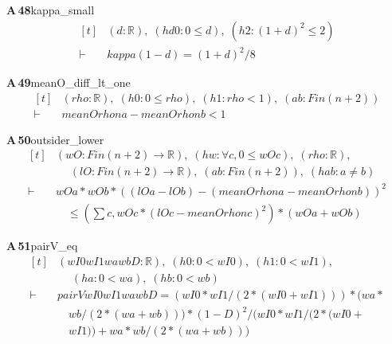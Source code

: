 \documentclass[conference]{IEEEtran}
\theoremstyle{definition}
\newcommand{\lean}[1]{\textsf{\footnotesize #1}}
\begin{document}
\noindent\textbf{A\,48}\quad\lean{kappa\_small}
{\footnotesize\[ \begin{aligned}[t]
&(\mathit{d} : \mathbb{R} ),\; (\mathit{hd0} : 0 \leq \mathit{d}),\; (\mathit{h2} : (1+\mathit{d})^{2} \leq 2)\\
\vdash\;&\mathit{kappa} (1-\mathit{d}) = (1+\mathit{d})^{2}/8
\end{aligned} \]}

\noindent\textbf{A\,49}\quad\lean{meanO\_diff\_lt\_one}
{\footnotesize\[ \begin{aligned}[t]
&(\mathit{rho} : \mathbb{R} ),\; (\mathit{h0} : 0 \leq \mathit{rho}),\; (\mathit{h1} : \mathit{rho} < 1),\; (\mathit{a} \mathit{b} : \mathit{Fin} (\mathit{n}+2))\\
\vdash\;&\mathit{meanO} \mathit{rho} \mathit{n} \mathit{a} - \mathit{meanO} \mathit{rho} \mathit{n} \mathit{b} < 1
\end{aligned} \]}

\noindent\textbf{A\,50}\quad\lean{outsider\_lower}
{\footnotesize\[ \begin{aligned}[t]
&(\mathit{wO} : \mathit{Fin} (\mathit{n}+2) \to \mathbb{R} ),\; (\mathit{hw} : \forall \mathit{c}, 0 \leq \mathit{wO} \mathit{c}),\; (\mathit{rho} : \mathbb{R} ),\\
&\quad \; (\mathit{lO} : \mathit{Fin} (\mathit{n}+2) \to \mathbb{R} ),\; (\mathit{a} \mathit{b} : \mathit{Fin} (\mathit{n}+2)),\; (\mathit{hab} : \mathit{a} \neq \mathit{b})\\
\vdash\;&\mathit{wO} \mathit{a}*\mathit{wO} \mathit{b}*((\mathit{lO} \mathit{a} - \mathit{lO} \mathit{b}) - (\mathit{meanO} \mathit{rho} \mathit{n} \mathit{a} - \mathit{meanO} \mathit{rho} \mathit{n} \mathit{b}))^{2}\\
&\quad \leq (\textstyle\sum \mathit{c}, \mathit{wO} \mathit{c}*(\mathit{lO} \mathit{c} - \mathit{meanO} \mathit{rho} \mathit{n} \mathit{c})^{2})*(\mathit{wO} \mathit{a} + \mathit{wO} \mathit{b})
\end{aligned} \]}

\noindent\textbf{A\,51}\quad\lean{pairV\_eq}
{\footnotesize\[ \begin{aligned}[t]
&(\mathit{wI0} \mathit{wI1} \mathit{wa} \mathit{wb} \mathit{D} : \mathbb{R} ),\; (\mathit{h0} : 0 < \mathit{wI0}),\; (\mathit{h1} : 0 < \mathit{wI1}),\\
&\quad \; (\mathit{ha} : 0 < \mathit{wa}),\; (\mathit{hb} : 0 < \mathit{wb})\\
\vdash\;&\mathit{pairV} \mathit{wI0} \mathit{wI1} \mathit{wa} \mathit{wb} \mathit{D} = (\mathit{wI0}*\mathit{wI1}/(2*(\mathit{wI0}+\mathit{wI1})))*(\mathit{wa}*\\
&\quad \mathit{wb}/(2*(\mathit{wa}+\mathit{wb})))*(1-\mathit{D})^{2} / (\mathit{wI0}*\mathit{wI1}/(2*(\mathit{wI0}+\\
&\quad \mathit{wI1})) + \mathit{wa}*\mathit{wb}/(2*(\mathit{wa}+\mathit{wb})))
\end{aligned} \]}
\end{document}
